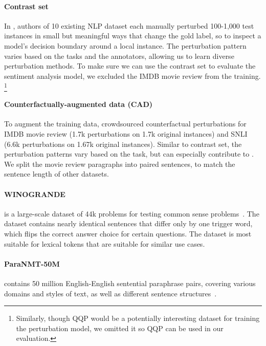 \paragraph{Contrast set}
In \cite{gardner2020contrast}, authors of 10 existing NLP dataset each manually perturbed 100-1,000 test instances in small but meaningful ways that change the gold label, so to inspect a model's decision boundary around a local instance.
The perturbation pattern varies based on the tasks and the annotators, allowing us to learn diverse perturbation methods.
To make sure we can use the contrast set to evaluate the sentiment analysis model, we excluded the IMDB movie review from the training.
\footnote{Similarly, though QQP would be a potentially interesting dataset for training the perturbation model, we omitted it so QQP can be used in our evaluation.}


\paragraph{Counterfactually-augmented data (CAD)}
To augment the training data, \citet{kaushik2019learning} crowdsourced counterfactual perturbations for IMDB movie review (1.7k perturbations on 1.7k original instances) and SNLI (6.6k perturbations on 1.67k original instances).
Similar to contrast set, the perturbation patterns vary based on the task, but can especially contribute to .
We split the movie review paragraphs into paired sentences, to match the sentence length of other datasets.


\paragraph{WINOGRANDE} is a large-scale dataset of 44k problems for testing common sense problems~\cite{sakaguchi2019winogrande}.
The dataset contains nearly identical sentences that differ only by one trigger word, which flips the correct answer choice for certain questions.
The dataset is most suitable for lexical tokens that are suitable for similar use cases.

\paragraph{ParaNMT-50M} contains 50 million English-English sentential paraphrase pairs, covering various domains and styles of text, as well as different sentence structures~\citet{wieting2017paranmt}. 

